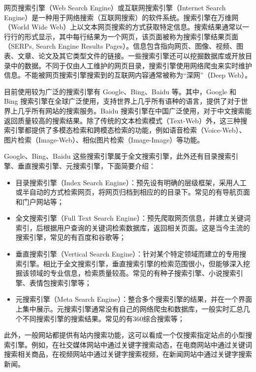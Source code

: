 \documentclass{ctexart}
\begin{document}
    网页搜索引擎（Web Search Engine）或互联网搜索引擎（Internet Search Engine）是一种用于网络搜索（互联网搜索）的软件系统。搜索引擎在万维网（World Wide Web）上以文本网页搜索的方式获取特定信息。搜索结果通常以一行行的形式显示，其中每行结果为一个网页，该页面被称为搜索引擎结果页面（SERPs, Search Engine Results Pages）。信息包含指向网页、图像、视频、图表、文章、论文及其它类型文件的链接。一些搜索引擎还可以挖掘数据库或开放目录中的数据。不同于仅由人工维护的网页目录，搜索引擎使用网络爬虫来实时维护信息。不能被网页搜索引擎搜索到的互联网内容通常被称为“深网”（Deep Web）\cite{wikipedia-search-engine}。

    目前使用较为广泛的搜索引擎有 Google、Bing、Baidu 等。其中，Google 和 Bing 搜索引擎在全球广泛使用，支持世界上几乎所有语种的语言，提供了对于世界上几乎所有网站的搜索服务。Baidu 搜索引擎在中国广泛使用，对于中文搜索能返回质量较高的搜索结果。除了传统的文本检索模式（Text-Web）外，这三种搜索引擎都提供了多模态检索和跨模态检索的功能，例如语音检索（Voice-Web）、图片检索（Image-Web）、相似图片检索（Image-Image）等功能。

    Google、Bing、Baidu 这些搜索引擎属于全文搜索引擎，此外还有目录搜索引擎、垂直搜索引擎、元搜索引擎\cite{baike-search-engine}，下面简要介绍：

    \begin{itemize}
        \item 目录搜索引擎（Index Search Engine）：预先设有明确的层级框架，采用人工或半自动的方式检索网页，将网页归档到相应的的目录下。常见的有导航页面和门户网站等；
        \item 全文搜索引擎（Full Text Search Engine）：预先爬取网页信息，并建立关键词索引，后根据用户查询的关键词检索数据库，返回相关页面。这是当今主流的搜索引擎，常见的有百度和谷歌等；
        \item 垂直搜索引擎（Vertical Search Engine）：针对某个特定领域而建立的专用搜索引擎。相比于全文搜索引擎，垂直搜索引擎的检索范围很小，但能够深入挖掘该领域的专业信息，检索质量较高。常见的有种子搜索引擎、小说搜索引擎、表情包搜索引擎等；
        \item 元搜索引擎（Meta Search Engine）：整合多个搜索引擎的结果，并在一个界面上集中展示。元搜索引擎通常没有自己的网络爬虫和数据库，一般实时汇总几个不同搜索引擎的搜索结果。常见的有360综合搜索等；
    \end{itemize}

    此外，一般网站都提供有站内搜索功能，这可以看成一个仅搜索指定站点的小型搜索引擎。例如，在社交媒体网站中通过关键字搜索动态，在电商网站中通过关键词搜索相关商品，在视频网站中通过关键字搜索视频，在新闻网站中通过关键字搜索新闻。
\end{document}
